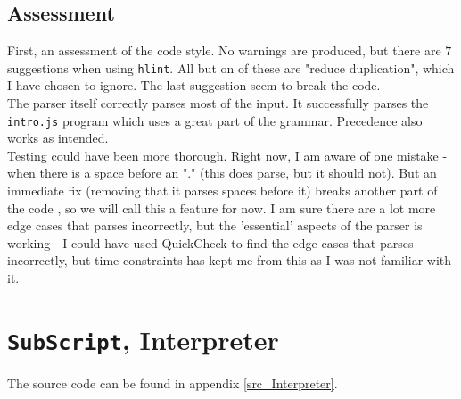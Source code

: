 \documentclass[a4paper]{article}
\begin{document}
\subsection{Assessment}
First, an assessment of the code style. No warnings are produced, but there are $7$ suggestions when using \texttt{hlint}. All but on of these are "reduce duplication", which I have chosen to ignore. The last suggestion seem to break the code. \\
The parser itself correctly parses most of the input. It successfully parses the \texttt{intro.js} program which uses a great part of the grammar. Precedence also works as intended. \\
Testing could have been more thorough. Right now, I am aware of one mistake - when there is a space before an "." (this does parse, but it should not). But an immediate fix (removing that it parses spaces before it) breaks another part of the code , so we will call this a feature for now. I am sure there are a lot more edge cases that parses incorrectly, but the 'essential' aspects of the parser is working - I could have used QuickCheck to find the edge cases that parses incorrectly, but time constraints has kept me from this as I was not familiar with it.

\section{\texttt{SubScript}, Interpreter}
The source code can be found in appendix \ref{src_Interpreter}.
\end{document}
